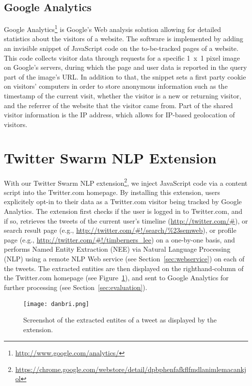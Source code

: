 \documentclass[runningheads,a4paper]{llncs}
\begin{document}
\subsection{Google Analytics}
Google Analytics\footnote{\url{http://www.google.com/analytics/}} is Google's Web analysis solution allowing for detailed statistics about the visitors of a website. The software is implemented by adding an invisible snippet of JavaScript code on the to-be-tracked pages of a website. This code collects visitor data through requests for a specific 1~x~1 pixel image on Google's servers, during which the page and user data is reported in the query part of the image's URL. In addition to that, the snippet sets a first party cookie on visitors' computers in order to store anonymous information such as the timestamp of the current visit, whether the visitor is a new or returning visitor, and the referrer of the website that the visitor came from. Part of the shared visitor information is the IP address, which allows for IP-based geolocation of visitors.
 
\section{Twitter Swarm NLP Extension}\label{sec:twitterswarm}
With our Twitter Swarm NLP extension\footnote{\url{https://chrome.google.com/webstore/detail/dpbphenfafkflfmdlanimlemacankjol}}, we inject JavaScript code via a content script into the Twitter.com homepage. By installing this extension, users explicitely opt-in to their data as a Twitter.com visitor being tracked by Google Analytics. The extension first checks if the user is logged in to Twitter.com, and if so, retrieves the tweets of the current user's timeline (\url{http://twitter.com/#}), or search result page (e.g., \url{http://twitter.com/#!/search/%23semweb}), or profile page (e.g., \url{http://twitter.com/#!/timberners_lee}) on a one-by-one basis, and performs Named Entity Extraction (NEE) via Natural Language Processing (NLP) using a remote NLP Web service (see Section~\ref{sec:webservice}) on each of the tweets. The extracted entities are then displayed on the righthand-column of the Twitter.com homepage (see Figure~\ref{fig:danbri}), and sent to Google Analytics for further processing (see Section~\ref{sec:evaluation}).

\begin{figure}[ht!]
  \centering
  \texttt{[image: danbri.png]}
  \caption{Screenshot of the extracted entites of a tweet as displayed by the extension.}
  \label{fig:danbri}
\end{figure}
\end{document}

